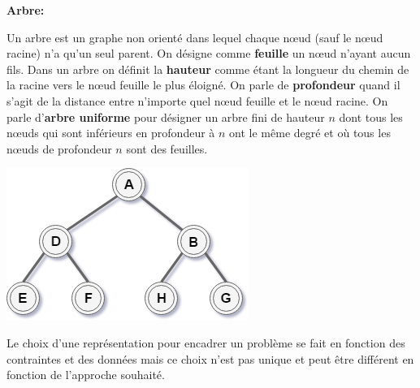 {\setlength{\parindent}{0cm}\textbf{Arbre:}}

Un arbre est un graphe non orienté dans lequel chaque nœud (sauf le nœud racine) n'a qu'un seul parent. 
On désigne comme \textbf{feuille} un nœud n'ayant aucun fils.
Dans un arbre on définit la \textbf{hauteur} comme étant la longueur du chemin de la racine vers le nœud feuille le plus éloigné. On parle de \textbf{profondeur} quand il s'agit de la distance entre n'importe quel nœud feuille et le nœud racine.
On parle d'\textbf{arbre uniforme} pour désigner un arbre fini de hauteur $n$ dont tous les nœuds qui sont inférieurs en profondeur à $n$ ont le même degré et où tous les nœuds de profondeur $n$ sont des feuilles.

\begin{center}
    \includegraphics[scale=0.6]{../ressources/images/example_tree.png}
\end{center}



Le choix d'une représentation pour encadrer un problème se fait en fonction des contraintes et des données mais ce choix n'est pas unique et peut être différent en fonction de l'approche souhaité.

